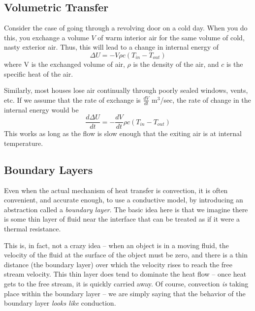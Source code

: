 \subsection{Volumetric Transfer}

Consider the case of going through a revolving door on a cold day.  When you do this, you exchange a volume $V$ of warm interior air for the same volume of cold, nasty exterior air.  Thus, this will lead to a change in internal energy of
$$ \Delta U = - V\rho c (T_{in} - T_{out})$$
where V is the exchanged volume of air, $\rho$ is the density of the air, and $c$ is the specific heat of the air.

Similarly, most houses lose air continually through poorly sealed windows, vents, etc.  If we assume that the rate of exchange is $\frac{dV}{dt}$ m$^3$/sec, the rate of change in the internal energy would be 
$$\frac{d\Delta U}{dt} = - \frac{dV}{dt} \rho c (T_{in} - T_{out})$$
This works as long as the flow is slow enough that the exiting air is at internal temperature.

\subsection{Boundary Layers}

Even when the actual mechanism of heat transfer is convection, it is often convenient, and accurate enough, to use a conductive model, by introducing an abstraction called a {\it boundary layer}. The basic idea here is that we imagine there is some thin layer of fluid near the interface that can be treated as if it were a thermal resistance.  

This is, in fact, not a crazy idea -- when an object is in a moving fluid, the velocity of the fluid at the surface of the object must be zero, and there is a thin distance (the boundary layer) over which the velocity rises to reach the free stream velocity.  This thin layer does tend to dominate the heat flow -- once heat gets to the free stream, it is quickly carried away.  Of course, convection {\it is} taking place within the boundary layer -- we are simply saying that the behavior of the boundary layer {\it looks like} conduction.  

